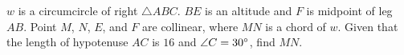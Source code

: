 $w$ is a circumcircle of right $\triangle ABC$. $BE$ is an altitude and $F$ is midpoint of leg $AB$. Point $M$, $N$, $E$, and $F$ are collinear, where $MN$ is a chord of $w$. Given that the length of hypotenuse $AC$ is $16$ and $\angle C=30\degree$, find $MN$. 
